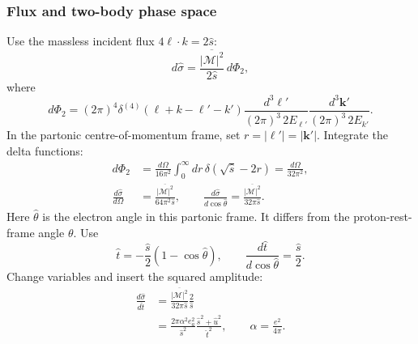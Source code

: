\documentclass[14pt,a4paper]{extarticle}
\numberwithin{equation}{section}
\newcommand{\M}{\mathcal M}
\begin{document}
\subsubsection{Flux and two-body phase space}
Use the massless incident flux $4\ell\cdot k=2\hat s$:
\begin{equation}
 d\hat\sigma=\frac{\overline{|\M|^2}}{2\hat s}\,d\Phi_2,
\end{equation}
where
\begin{equation}
 d\Phi_2=(2\pi)^4\delta^{(4)}(\ell+k-\ell'-k')
 \frac{d^3\bm\ell'}{(2\pi)^3\,2E_{\ell'}}
 \frac{d^3\bm k'}{(2\pi)^3\,2E_{k'}}.
 \label{eq:hard-phase-space}
\end{equation}
In the partonic centre-of-momentum frame, set $r=|\bm\ell'|=|\bm k'|$.
Integrate the delta functions:
\begin{align}
 d\Phi_2&=\frac{d\Omega}{16\pi^2}
 \int_0^\infty dr\,\delta(\sqrt{\hat s}-2r)
 =\frac{d\Omega}{32\pi^2},\\
 \frac{d\hat\sigma}{d\Omega}
 &=\frac{\overline{|\M|^2}}{64\pi^2\hat s},\qquad
 \frac{d\hat\sigma}{d\cos\hat\theta}
 =\frac{\overline{|\M|^2}}{32\pi\hat s}.
\end{align}
Here $\hat\theta$ is the electron angle in this partonic frame.
It differs from the proton-rest-frame angle $\theta$.
Use
\begin{equation}
 \hat t=-\frac{\hat s}{2}(1-\cos\hat\theta),\qquad
 \frac{d\hat t}{d\cos\hat\theta}=\frac{\hat s}{2}.
 \label{eq:hard-cm-invariants}
\end{equation}
Change variables and insert the squared amplitude:
\begin{align}
 \frac{d\hat\sigma}{d\hat t}
 &=\frac{\overline{|\M|^2}}{32\pi\hat s}\frac{2}{\hat s}\\
 &=\boxed{\frac{2\pi\alpha^2e_a^2}{\hat s^2}
 \frac{\hat s^2+\hat u^2}{\hat t^2}},\qquad
 \alpha=\frac{e^2}{4\pi}.
 \label{eq:hard-dsigma-dt}
\end{align}
\end{document}
